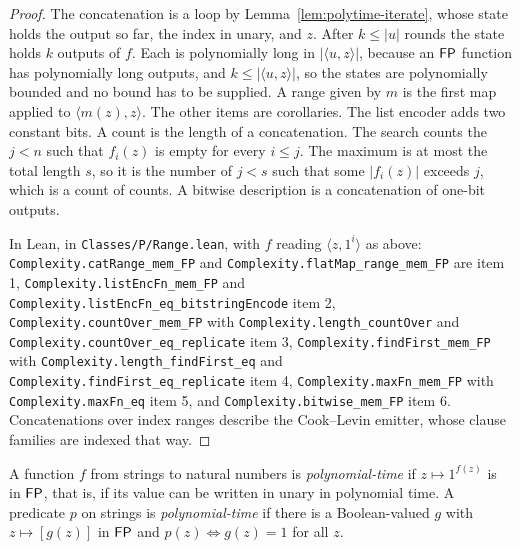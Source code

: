 \begin{proof}
  \leanok
  The concatenation is a loop by Lemma~\ref{lem:polytime-iterate}, whose state
  holds the output so far, the index in unary, and $z$. After $k \le |u|$
  rounds the state holds $k$ outputs of $f$. Each is polynomially long in
  $|\langle u, z \rangle|$, because an $\mathsf{FP}$ function has polynomially long
  outputs, and $k \le |\langle u, z \rangle|$, so the states are polynomially
  bounded and no bound has to be supplied. A range given by $m$ is the first
  map applied to $\langle m(z), z \rangle$. The other items are corollaries. The
  list encoder adds two constant bits. A count is the length of a
  concatenation. The search counts the $j < n$ such that $f_i(z)$ is empty for
  every $i \le j$. The maximum is at most the total length $s$, so it is the
  number of $j < s$ such that some $|f_i(z)|$ exceeds $j$, which is a count of
  counts. A bitwise description is a concatenation of one-bit outputs.

  In Lean, in \texttt{Classes/P/Range.lean}, with $f$ reading
  $\langle z, 1^i \rangle$ as above: \texttt{Complexity.catRange\_mem\_FP} and
  \texttt{Complexity.flatMap\_range\_mem\_FP} are item 1,
  \texttt{Complexity.listEncFn\_mem\_FP} and
  \texttt{Complexity.listEncFn\_eq\_bitstringEncode} item 2,
  \texttt{Complexity.countOver\_mem\_FP} with
  \texttt{Complexity.length\_countOver} and
  \texttt{Complexity.countOver\_eq\_replicate} item 3,
  \texttt{Complexity.findFirst\_mem\_FP} with
  \texttt{Complexity.length\_findFirst\_eq} and
  \texttt{Complexity.findFirst\_eq\_replicate} item 4,
  \texttt{Complexity.maxFn\_mem\_FP} with \texttt{Complexity.maxFn\_eq} item
  5, and \texttt{Complexity.bitwise\_mem\_FP} item 6. Concatenations over index
  ranges describe the Cook--Levin emitter, whose clause families are indexed
  that way.
\end{proof}

\begin{definition}
  \label{def:polytime-unary-fn}
  \leanok
  A function $f$ from strings to natural numbers is \emph{polynomial-time} if
  $z \mapsto 1^{f(z)}$ is in $\mathsf{FP}$, that is, if its value can be written
  in unary in polynomial time. A predicate $p$ on strings is
  \emph{polynomial-time} if there is a Boolean-valued $g$ with
  $z \mapsto [g(z)]$ in $\mathsf{FP}$ and $p(z) \iff g(z) = 1$ for all $z$.
\end{definition}

